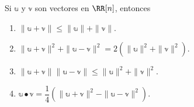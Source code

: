 \begin{theorem}{}{}
    Si $\mathbb{u}$ y $\mathbb{v}$ son vectores en $\RR[n]$, entonces
    \begin{enumerate}[label=\roman*), topsep=6pt, itemsep=0pt]
        \item $\| \mathbb{u} + \mathbb{v} \| \leq \| \mathbb{u} \| + \| \mathbb{v} \|$. \hfill {}
        \item $\| \mathbb{u} + \mathbb{v} \|^2 + \| \mathbb{u} - \mathbb{v} \|^2 = 2 \left( \| \mathbb{u} \|^2 + \| \mathbb{v} \|^2 \right)$. \hfill {}
        \item $\| \mathbb{u} + \mathbb{v} \| \| \mathbb{u} - \mathbb{v} \| \leq \| \mathbb{u} \|^2 + \| \mathbb{v} \|^2$.
        \item $\mathbb{u} \bullet \mathbb{v} = \dfrac{1}{4} \left(\| \mathbb{u} + \mathbb{v} \|^2 - \| \mathbb{u} - \mathbb{v} \|^2\right)$. \hfill {}
    \end{enumerate}


\end{theorem}
